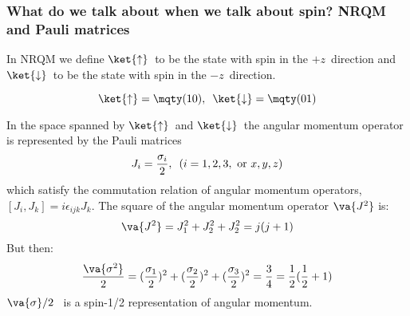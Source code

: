 \begin{frame}
\frametitle{What do we talk about when we talk about spin? NRQM and Pauli matrices}

In NRQM we define $\ket{\uparrow}$~to be the state with spin in the $+z$~direction and 
$\ket{\downarrow}$~to be the state with spin in the $-z$~direction.
 
\[
\ket{\uparrow} = \mqty(1\\0), \,\,\, \ket{\downarrow} = \mqty(0\\1)
\]

In the space spanned by $\ket{\uparrow}$~and $\ket{\downarrow}$~the angular momentum operator is represented by the Pauli matrices
\[
J_i =\frac{\sigma_i}{2}, \,\,\, (i=1,2,3, ~{\rm or}~x,y,z)
\]
which satisfy the commutation relation of angular momentum operators, 
$[J_i, J_k] = i \epsilon_{ijk} J_k$. The square of the angular momentum operator $\va{J^2}$ is:
\[
\va{J^2} =J_1^2 + J_2^2 + J_2^2 = j(j+1)
\]
But then: 
\[
\frac{\va{\sigma^2}}{2} =(\frac{\sigma_1}{2})^2 + (\frac{\sigma_2}{2})^2 + (\frac{\sigma_3}{2})^2 
= \frac{3}{4} = \frac{1}{2}(\frac{1}{2} + 1)
\]
$\va{\sigma}/2$~ is  a spin-1/2 representation of angular momentum.
\end{frame}
